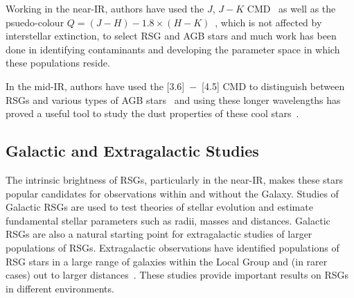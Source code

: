 Working in the near-IR, authors have used the $J$, $J-K$ CMD~\citep[e.g.][]{2000ApJ...542..804N,2006A&A...452..195C,Neugent12,2015ApJ...803...14P} as well as the psuedo-colour
$Q = (J-H) - 1.8\times(H-K)$~\citep[ e.g.][]{2005A&A...430..541C,2009A&A...498..109C,2010A&A...513A..74N,2011A&A...528A..59N,2012A&A...539A.100G,2012A&A...537A..10M,2015A&A...578A...3G},
which is not affected by interstellar extinction,
to select RSG and AGB stars and much work has been done in identifying contaminants and developing the parameter space in which these populations reside.

In the mid-IR, authors have used the [3.6]~$-$~[4.5] CMD to distinguish between RSGs and various types of AGB stars~\citep{2006AJ....132.2034B,2014A&A...562A..75B,2015A&A...584A..33B,2015ApJ...800...51B,2015A&A...578A.100W} and using these longer wavelengths has proved a useful tool to study the dust properties of these cool stars~\citep{Beasor-prep}.



\subsection{Galactic and Extragalactic Studies} %
\label{sub:galactic_and_extragalactic}

The intrinsic brightness of RSGs, particularly in the near-IR, makes these stars popular candidates for observations within and without the Galaxy.
Studies of Galactic RSGs are used to test theories of stellar evolution and estimate fundamental stellar parameters such as radii, masses and distances.
Galactic RSGs are also a natural starting point for extragalactic studies of larger populations of RSGs.
Extragalactic observations have identified populations of RSG stars in a large range of galaxies within the Local Group and (in rarer cases) out to larger distances~\citep[e.g.][and see Chapter~\ref{ch:ngc55}]{Elias85,Humphreys86, Massey06, 2007AJ....134.2474M, Groenewegen09,Massey13,2015ApJ...805..182G}.
These studies provide important results on RSGs in different environments.


